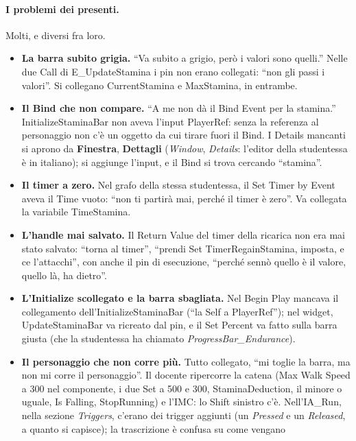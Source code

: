 \paragraph{I problemi dei presenti.} Molti, e diversi fra loro.
\begin{itemize}
  \item \textbf{La barra subito grigia.} ``Va subito a grigio, però i valori sono quelli.''
        Nelle due Call di E\_UpdateStamina i pin non erano collegati: ``non gli passi i
        valori''. Si collegano CurrentStamina e MaxStamina, in entrambe.
  \item \textbf{Il Bind che non compare.} ``A me non dà il Bind Event per la stamina.''
        InitializeStaminaBar non aveva l'input PlayerRef: senza la referenza al personaggio
        non c'è un oggetto da cui tirare fuori il Bind. I Details mancanti si aprono da
        \textbf{Finestra}, \textbf{Dettagli} (\emph{Window}, \emph{Details}: l'editor della
        studentessa è in italiano); si aggiunge l'input, e il Bind si trova cercando
        ``stamina''.
  \item \textbf{Il timer a zero.} Nel grafo della stessa studentessa, il Set Timer by
        Event aveva il Time vuoto: ``non ti partirà mai, perché il timer è zero''. Va
        collegata la variabile TimeStamina.
  \item \textbf{L'handle mai salvato.} Il Return Value del timer della ricarica non era
        mai stato salvato: ``torna al timer'', ``prendi Set TimerRegainStamina, imposta, e
        ce l'attacchi'', con anche il pin di esecuzione, ``perché sennò quello è il
        valore, quello là, ha dietro''.
  \item \textbf{L'Initialize scollegato e la barra sbagliata.} Nel Begin Play mancava il
        collegamento dell'InitializeStaminaBar (``la Self a PlayerRef''); nel widget,
        UpdateStaminaBar va ricreato dal pin, e il Set Percent va fatto sulla barra giusta
        (che la studentessa ha chiamato \emph{ProgressBar\_Endurance}).
  \item \textbf{Il personaggio che non corre più.} Tutto collegato, ``mi toglie la barra,
        ma non mi corre il personaggio''. Il docente ripercorre la catena (Max Walk Speed a
        300 nel componente, i due Set a 500 e 300, StaminaDeduction, il minore o uguale, Is
        Falling, StopRunning) e l'IMC: lo Shift sinistro c'è. Nell'IA\_Run, nella sezione
        \emph{Triggers}, c'erano dei trigger aggiunti (un \emph{Pressed} e un
        \emph{Released}, a quanto si capisce); la trascrizione è confusa su come vengano

\end{itemize}
